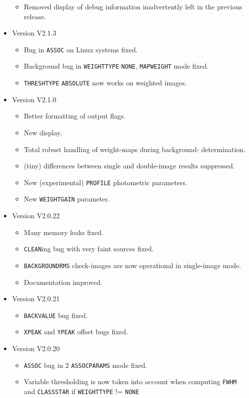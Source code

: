 \documentclass[twoside,11pt]{article}
\renewcommand{\_}{\texttt{\symbol{95}}}
\begin{document}
\begin{itemize}
\begin{itemize}
        \item Removed display of debug information inadvertently left
              in the previous release.
      \end{itemize}
   \item Version V2.1.3
      \begin{itemize}
        \item Bug in \texttt{ASSOC} on Linux systems fixed.
        \item Background bug in \texttt{WEIGHT\_TYPE} \texttt{NONE},
              \texttt{MAP\_WEIGHT} mode fixed.
        \item \texttt{THRESH\_TYPE} \texttt{ABSOLUTE} now works on
              weighted images.
      \end{itemize}
   \item Version V2.1.0
      \begin{itemize}
        \item Better formatting of output flags.
        \item  New display.
        \item Total robust handling of weight-maps during background-
              determination.
        \item (tiny) differences between single and double-image results
              suppressed.
        \item New (experimental) \texttt{\_PROFILE} photometric parameters.
        \item New \texttt{WEIGHT\_GAIN} parameter.
      \end{itemize}
   \item Version V2.0.22
      \begin{itemize}
        \item Many memory leaks fixed.
        \item \texttt{CLEAN}ing bug with very faint sources fixed.
        \item \texttt{BACKGROUND\_RMS} check-images are now operational in
              single-image mode.
        \item Documentation improved.
      \end{itemize}
   \item Version V2.0.21
      \begin{itemize}
        \item \texttt{BACK\_VALUE} bug fixed.
        \item \texttt{XPEAK} and \texttt{YPEAK} offset bugs fixed.
      \end{itemize}
   \item Version V2.0.20
      \begin{itemize}
        \item \texttt{ASSOC} bug in 2 \texttt{ASSOC\_PARAMS} mode fixed.
        \item Variable thresholding is now taken into account when
              computing \texttt{FWHM} and \texttt{CLASS\_STAR}
              if \texttt{WEIGHT\_TYPE} != \texttt{NONE}
      \end{itemize}
 \end{itemize}
\end{document}

